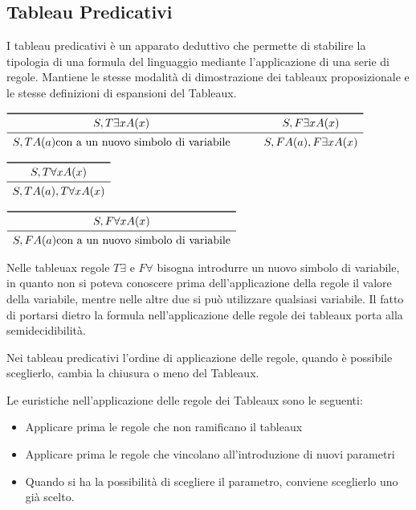 \subsection{Tableau Predicativi}
I tableau predicativi è un apparato deduttivo che permette di stabilire la tipologia
di una formula del linguaggio mediante l'applicazione di una serie di regole.
Mantiene le stesse modalità di dimostrazione dei tableaux proposizionale e le stesse
definizioni di espansioni del Tableaux.

$\begin{array}{cc}
\toprule S, T \exists x A(x) & \qquad S, F \exists x A(x) \\
\midrule S,T A(a) \text{con a un nuovo simbolo di variabile} & \qquad S,F A(a),F \exists x A(x) \\
\end{array}$

$\begin{array}{c}
\toprule S,T \forall x A(x) \\
\midrule S, T A(a), T \forall x A(x)\\
\end{array}$

\qquad $\begin{array}{c}
\toprule S,F \forall x A(x) \\
\midrule S,F A(a) \text{con a un nuovo simbolo di variabile} \\
\end{array}$

Nelle tableuax regole $T \exists$ e $F \forall$ bisogna introdurre un nuovo simbolo di
variabile, in quanto non si poteva conoscere prima dell'applicazione della regole
il valore della variabile, mentre nelle altre due si può utilizzare qualsiasi variabile.
Il fatto di portarsi dietro la formula nell'applicazione delle regole dei tableaux
porta alla semidecidibilità.

Nei tableau predicativi l'ordine di applicazione delle regole, quando è possibile
sceglierlo, cambia la chiusura o meno del Tableaux.

Le euristiche nell'applicazione delle regole dei Tableaux sono le seguenti:
\begin{itemize}
    \item Applicare prima le regole che non ramificano il tableaux
    \item Applicare prima le regole che vincolano all'introduzione di nuovi parametri
    \item Quando si ha la possibilità di scegliere il parametro, conviene sceglierlo uno già scelto.
\end{itemize}

